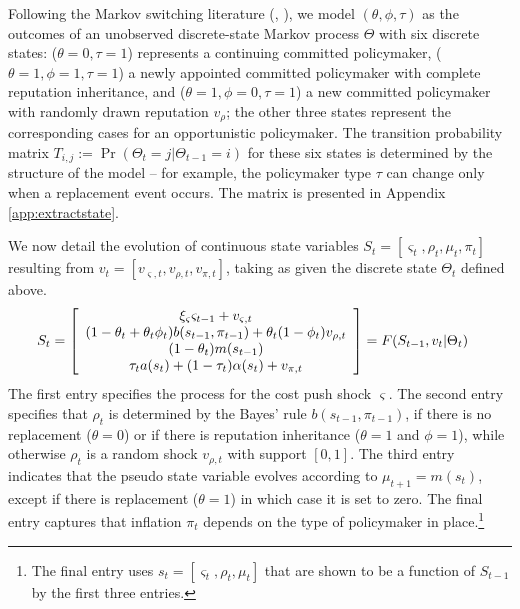 \documentclass[12pt,letter,leqno]{article}
\theoremstyle{asn}
\theoremstyle{lem}
\theoremstyle{slem}
\theoremstyle{prop}
\theoremstyle{appprop}
\theoremstyle{rem}
\theoremstyle{defn}
\begin{document}
Following the Markov switching literature (\cite{hamilton_new_1989}, \cite{kim_dynamic_1994}), we model $(\theta, \phi, \tau)$ as the outcomes of an unobserved discrete-state Markov process $\Theta$ with six discrete states: ($\theta = 0, \tau = 1$) represents a continuing committed policymaker, ($\theta = 1, \phi = 1, \tau = 1$) a newly appointed committed policymaker with complete reputation inheritance, and ($\theta = 1, \phi = 0, \tau = 1$) a new committed policymaker with randomly drawn reputation $v_\rho$; the other three states represent the corresponding cases for an opportunistic policymaker. The transition probability matrix $T_{i,j}:=\Pr(\Theta_t=j|\Theta_{t-1}=i)$ for these six states is determined by the structure of the model -- for example, the policymaker type $\tau$ can change only when a replacement event occurs. The matrix is presented in Appendix \ref{app:extractstate}.

We now detail the evolution of continuous state variables $S_{t}=[\varsigma_{t}, \rho_{t},\mu_{t}, \pi_{t}]$ resulting from $v_t =[v_{\varsigma,t}, v_{\rho,t}, v_{\pi,t}]$, taking as given the discrete state $\Theta_t$ defined above. 
\begin{align}\label{eq:state-evolution}
S_{t}  &  =\left[
\begin{array}
[c]{c}%
\xi_\varsigma\varsigma_{t-1}+v_{\varsigma,t}\\
(1-\theta_{t}+\theta_{t}\phi_{t})b(s_{t-1},\pi_{t-1}
)+\theta_{t}(1-\phi_{t})v_{\rho,t}\\
(1-\theta_{t})m(s_{t-1})\\
\tau_{t}a(s_t)+(1-\tau_{t})\alpha(s_t)+v_{\pi,t}%
\end{array}
\right] =F(S_{t-1},v_{t}|\Theta_{t})
\end{align}
The first entry specifies the process for the cost push shock $\varsigma$. The second entry specifies that $\rho_{t}$ is determined by the Bayes' rule $b(s_{t-1},\pi_{t-1})$, if there is no replacement ($\theta=0$) or if there is reputation inheritance ($\theta=1$ and $\phi=1$), while otherwise $\rho_{t}$ is a random shock $v_{\rho,t}$ with support $[0,1]$. The third entry indicates that the pseudo state variable evolves according to $\mu_{t+1}=m(s_{t})$, except if there is replacement ($\theta=1$) in which case it is set to zero. The final entry captures that inflation $\pi_{t}$ depends on the type of policymaker in place.\footnote{The final entry uses $s_t=[\varsigma_t,\rho_t,\mu_t]$ that are shown to be a function of $S_{t-1}$ by the first three entries.}
\end{document}
